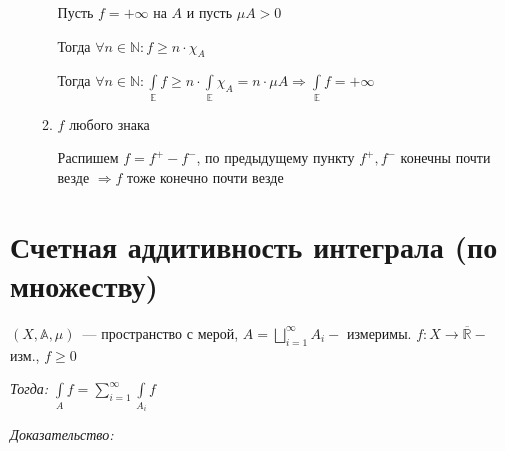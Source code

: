\documentclass[paper=a4, fontsize=17pt]{article}
\begin{document}
\begin{enumerate}
\begin{enumerate}
		Пусть $f = +\infty$ на $A$ и пусть $\mu A > 0$

		Тогда $\forall n \in \mathds{N}: f \geqslant n \cdot \chi_A$

		Тогда $\forall n \in \mathds{N}: \int\limits_{\mathds{E}} f \geqslant n \cdot \int\limits_{\mathds{E}} \chi_A = n \cdot \mu A \Rightarrow \int\limits_{\mathds{E}} f = + \infty$

		\item $f$ любого знака

		Распишем $f = f^+ - f^-$, по предыдущему пункту $f^+, f^-$ конечны почти везде $\Rightarrow f$ тоже конечно почти везде
	\end{enumerate}

\end{enumerate}

\section{Счетная аддитивность интеграла (по множеству)}
$(X,\mathds{A},\mu)$~--- пространство с мерой, $A = \bigsqcup\limits_{i=1}^{\infty}A_{i} -$ измеримы. $f: X \rightarrow \mathbb{\overline{R}} - $ изм., $f \geqslant 0$

\emph{Тогда:} ${\displaystyle \int\limits_{A}f = \sum\limits_{i=1}^{\infty} \int\limits_{A_{i}}f}$

\emph{Доказательство:}
\end{document}
